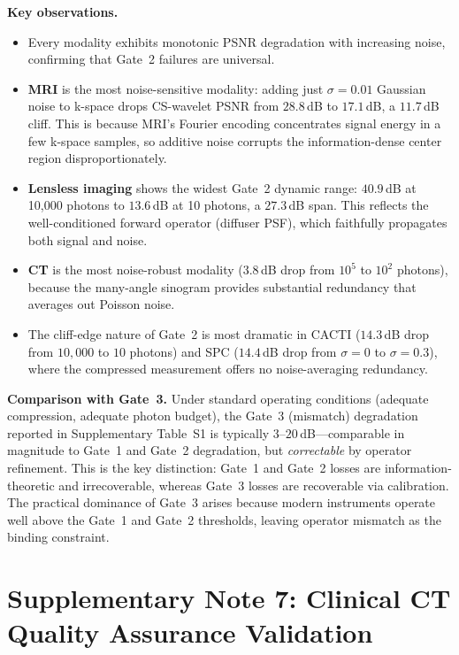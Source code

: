\documentclass[11pt]{article}
\theoremstyle{definition}
\begin{document}
\noindent\textbf{Key observations.}
\begin{itemize}
  \item Every modality exhibits monotonic PSNR degradation with
    increasing noise, confirming that Gate~2 failures are universal.
  \item \textbf{MRI} is the most noise-sensitive modality: adding just
    $\sigma{=}0.01$ Gaussian noise to k-space drops CS-wavelet PSNR from
    $28.8$\,dB to $17.1$\,dB, a $11.7$\,dB cliff. This is because MRI's
    Fourier encoding concentrates signal energy in a few k-space samples,
    so additive noise corrupts the information-dense center region
    disproportionately.
  \item \textbf{Lensless imaging} shows the widest Gate~2 dynamic range:
    $40.9$\,dB at 10,000 photons to $13.6$\,dB at 10 photons, a $27.3$\,dB
    span. This reflects the well-conditioned forward operator (diffuser PSF),
    which faithfully propagates both signal and noise.
  \item \textbf{CT} is the most noise-robust modality ($3.8$\,dB drop from
    $10^5$ to $10^2$ photons), because the many-angle sinogram provides
    substantial redundancy that averages out Poisson noise.
  \item The cliff-edge nature of Gate~2 is most dramatic in CACTI
    ($14.3$\,dB drop from $10{,}000$ to $10$ photons) and SPC
    ($14.4$\,dB drop from $\sigma{=}0$ to $\sigma{=}0.3$), where the
    compressed measurement offers no noise-averaging redundancy.
\end{itemize}

\noindent\textbf{Comparison with Gate~3.}
Under standard operating conditions (adequate compression, adequate
photon budget), the Gate~3 (mismatch) degradation reported in
Supplementary Table~S1 is typically $3$--$20$\,dB---comparable in
magnitude to Gate~1 and Gate~2 degradation, but \emph{correctable} by
operator refinement.  This is the key distinction: Gate~1 and Gate~2
losses are information-theoretic and irrecoverable, whereas Gate~3
losses are recoverable via calibration.  The practical dominance of
Gate~3 arises because modern instruments operate well above the Gate~1
and Gate~2 thresholds, leaving operator mismatch as the binding
constraint.


\newpage
\section{Supplementary Note 7: Clinical CT Quality Assurance Validation}
\label{sec:ctqc}
\end{document}
